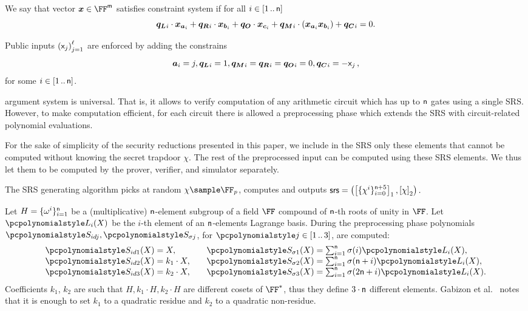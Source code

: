 We say that vector $\vx \in \FF^\noofw$ satisfies constraint system if for all $i
\in [1 \, .. \, \mathsf{n}]$
\[
\vql_i \cdot \vx_{\va_i} + \vqr_i \cdot \vx_{\vb_i} + \vqo \cdot \vx_{\vc_i} +
\vqm_i \cdot (\vx_{\va_i} \vx_{\vb_i}) + \vqc_i = 0. 
\]

Public inputs $\left(\mathsf{x}_j\right)_{j = 1}^{\mathsf{\ell}}$ are enforced by adding the constrains
\[ \va_i = j, \vql_i = 1, \vqm_i = \vqr_i = \vqo_i = 0, \vqc_i = -\inp_j\,,
\]
for some $i \in [1 \, .. \, \mathsf{n}]$.

\label{sec:plonk_explained}
\plonk{} argument system is universal. That is, it allows to verify computation
of any arithmetic circuit which has up to $\mathsf{n}$
gates using a single SRS. However, to make computation efficient, for each
circuit there is allowed a preprocessing phase which extends the SRS with
circuit-related polynomial evaluations.

For the sake of simplicity of the security reductions presented in this paper, we
include in the SRS only these elements that cannot be computed without knowing
the secret trapdoor $\chi$. The rest of the preprocessed input can
be computed using these SRS elements. We thus let them to be computed by the
prover, verifier, and simulator separately.

The SRS generating algorithm picks at random $\chi \sample \FF_p$, computes
and outputs
\(
\mathsf{srs} = \left(\left[\{\chi^i\}_{i = 0}^{\mathsf{n} + 5}\right]_{1},
\left[\chi\right]_{2} \right).
\)

Let $H = \{\omega^i\}_{i = 1}^{\mathsf{n} }$ be a
(multiplicative) $\mathsf{n}$-element subgroup of a field $\FF$
compound of $\mathsf{n}$-th roots of unity in $\FF$. Let $\lag_i(X)$ be
the $i$-th element of an $\mathsf{n}$-elements Lagrange basis. During
the preprocessing phase polynomials $\p{S_{id j}}, \p{S_{\sigma j}}$, for
$\p{j} \in \range{1}{3}$, are computed:
\begin{equation*}
\begin{aligned}
\p{S_{id 1}}(X) & = X,\\[\myskip]
\p{S_{id 2}}(X) & = k_1 \cdot X,\\[\myskip]
\p{S_{id 3}}(X) & = k_2 \cdot X,
\end{aligned}
\qquad
\begin{aligned}
\p{S_{\sigma 1}}(X) & = {\textstyle{\sum_{i = 1}^{\noofc} \sigma(i) \lag_i(X)}},\\[\myskip]
\p{S_{\sigma 2}}(X) & = {\textstyle \sum_{i = 1}^{\noofc}
	\sigma(\noofc + i) \lag_i(X)},\\[\myskip]
\p{S_{\sigma 3}}(X) & ={\textstyle\sum_{i = 1}^{\noofc} \sigma(2 \noofc + i) \lag_i(X)}.
\end{aligned}
\end{equation*}
Coefficients $k_1$, $k_2$ are such that $H, k_1 \cdot H, k_2 \cdot H$ are
different cosets of $\FF^*$, thus they define $3 \cdot \mathsf{n}$
different elements. Gabizon et al.~\cite{EPRINT:GabWilCio19} notes that it is enough to set
$k_1$ to a quadratic residue and $k_2$ to a quadratic non-residue.

